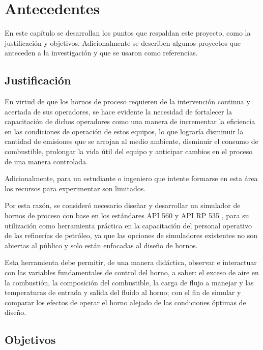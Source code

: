 \chapter{Antecedentes}

\par En este capítulo se desarrollan los puntos que respaldan este proyecto, como la justificación y objetivos. Adicionalmente se describen algunos proyectos que anteceden a la investigación y que se usaron como referencias.

\section{Justificación}

\par En virtud de que los hornos de proceso requieren de la intervención continua y acertada de sus operadores, se hace evidente la necesidad de fortalecer la capacitación de dichos operadores como una manera de incrementar la eficiencia en las condiciones de operación de estos equipos, lo que lograría disminuir la cantidad de emisiones que se arrojan al medio ambiente, disminuir el consumo de combustible, prolongar la vida útil del equipo y anticipar cambios en el proceso de una manera controlada.
\par Adicionalmente, para un estudiante o ingeniero que intente formarse en esta área los recursos para experimentar son limitados.
\par Por esta razón, se consideró necesario diseñar y desarrollar un simulador de hornos de proceso con base en los estándares API 560 \cite{bib:api560} y API RP 535 \cite{bib:api535}, para su utilización como herramienta práctica en la capacitación del personal operativo de las refinerías de petróleo, ya que las opciones de simuladores existentes no son abiertas al público y solo están enfocadas al diseño de hornos.
\par Esta herramienta debe permitir, de una manera didáctica, observar e interactuar con las variables fundamentales de control del horno, a saber: el exceso de aire en la combustión, la composición del combustible, la carga de flujo a manejar y las temperaturas de entrada y salida del fluido al horno; con el fin de simular y comparar los efectos de operar el horno alejado de las condiciones óptimas de diseño.

\section{Objetivos}

